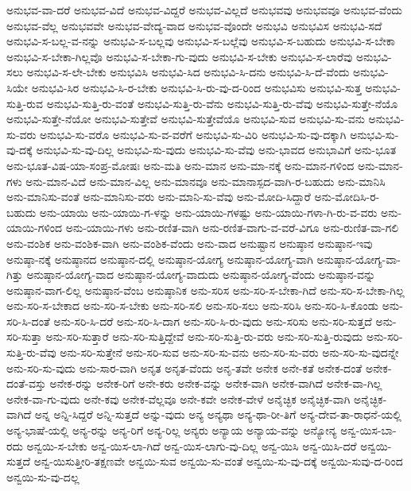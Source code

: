 {ಅನುಭವ-ವಾ-ದರೆ
ಅನುಭವ-ವಿದೆ
ಅನುಭವ-ವಿದ್ದರೆ
ಅನುಭವ-ವಿಲ್ಲದೆ
ಅನುಭವವು
ಅನುಭವವೂ
ಅನುಭವ-ವೆಂದು
ಅನುಭವ-ವೆಲ್ಲ
ಅನುಭವವೇ
ಅನುಭವ-ವೇದ್ಯ-ವಾದ
ಅನುಭವ-ವೊಂದೇ
ಅನುಭವಿ
ಅನುಭವಿಸ
ಅನುಭವಿ-ಸದೆ
ಅನುಭವಿ-ಸ-ಬಲ್ಲ-ವ-ನನ್ನು
ಅನುಭವಿ-ಸ-ಬಲ್ಲವು
ಅನುಭವಿ-ಸ-ಬಲ್ಲೆವು
ಅನುಭವಿ-ಸ-ಬಹುದು
ಅನುಭವಿ-ಸ-ಬೇಕಾ
ಅನುಭವಿ-ಸ-ಬೇಕಾ-ಗಿಲ್ಲವೊ
ಅನುಭವಿ-ಸ-ಬೇಕಾ-ಗು-ವುದು
ಅನುಭವಿ-ಸ-ಬೇಕು
ಅನುಭವಿ-ಸ-ಲಾರೆವು
ಅನುಭವಿ-ಸಲು
ಅನುಭವಿ-ಸ-ಲೇ-ಬೇಕು
ಅನುಭವಿಸಿ
ಅನುಭವಿ-ಸಿದ
ಅನುಭವಿ-ಸಿ-ದನು
ಅನುಭವಿ-ಸಿ-ದೆ-ವೆಂದು
ಅನುಭವಿ-ಸಿಯೇ
ಅನುಭವಿ-ಸಿರ
ಅನುಭವಿ-ಸಿ-ರ-ಬೇಕು
ಅನುಭವಿ-ಸಿ-ರು-ವು-ದ-ರಿಂದ
ಅನುಭವಿಸು
ಅನುಭವಿ-ಸುತ್ತ
ಅನುಭವಿ-ಸುತ್ತಿ-ರುವ
ಅನುಭವಿ-ಸುತ್ತಿ-ರು-ವಂತೆ
ಅನುಭವಿ-ಸುತ್ತಿ-ರು-ವೆನು
ಅನುಭವಿ-ಸುತ್ತಿ-ರು-ವೆವು
ಅನುಭವಿ-ಸುತ್ತೇ-ನೆಯೊ
ಅನುಭವಿ-ಸುತ್ತೇ-ನೆಯೋ
ಅನುಭವಿ-ಸುತ್ತೇವೆ
ಅನುಭವಿ-ಸುತ್ತೇವೆಯೊ
ಅನುಭವಿ-ಸುವ
ಅನುಭವಿ-ಸು-ವನು
ಅನುಭವಿ-ಸು-ವರು
ಅನುಭವಿ-ಸು-ವರೊ
ಅನುಭವಿ-ಸು-ವ-ವರೆಗೆ
ಅನುಭವಿ-ಸು-ವಿರಿ
ಅನುಭವಿ-ಸು-ವು-ದಕ್ಕಾಗಿ
ಅನುಭವಿ-ಸು-ವು-ದಕ್ಕೆ
ಅನುಭವಿ-ಸು-ವು-ದಿಲ್ಲ
ಅನುಭವಿ-ಸು-ವುದು
ಅನುಭವಿ-ಸು-ವೆವು
ಅನು-ಭಾವದ
ಅನುಭಾವಿಗೆ
ಅನು-ಭೂತ
ಅನು-ಭೂತ-ವಿಷ-ಯಾ-ಸಂಪ್ರ-ಮೋಷಃ
ಅನು-ಮತಿ
ಅನು-ಮಾನ
ಅನು-ಮಾ-ನಕ್ಕೆ
ಅನು-ಮಾನ-ಗಳಿಂದ
ಅನು-ಮಾನ-ಗಳು
ಅನು-ಮಾನ-ವಿದೆ
ಅನು-ಮಾನ-ವಿಲ್ಲ
ಅನು-ಮಾನವೂ
ಅನು-ಮಾನಾಸ್ಪದ-ವಾಗಿ-ರ-ಬಹುದು
ಅನು-ಮಾನಿಸಿ
ಅನು-ಮಾನಿಸು-ವಂತೆ
ಅನು-ಮಾನಿಸು-ವರು
ಅನು-ಮಾನಿ-ಸು-ವೆವು
ಅನು-ಮೋದಿ-ಸಿದ್ದಾರೆ
ಅನು-ಮೋದಿಸಿ-ರ-ಬಹುದು
ಅನು-ಯಾಯಿ
ಅನು-ಯಾಯಿ-ಗ-ಳನ್ನು
ಅನು-ಯಾಯಿ-ಗಳಷ್ಟು
ಅನು-ಯಾಯಿ-ಗಳಾ-ಗಿ-ರು-ವ-ವರು
ಅನು-ಯಾಯಿ-ಗಳಿಂದ
ಅನು-ಯಾಯಿ-ಗಳು
ಅನು-ರಣಿತ-ವಾಗಿ
ಅನು-ರಣಿತ-ವಾಗು-ವ-ವರೆ-ವಿಗೂ
ಅನು-ರುಣಿತ-ವಾ-ಗಲಿ
ಅನು-ವಂಶಿಕ
ಅನು-ವಂಶಿಕ-ವಾಗಿ
ಅನು-ವಂಶಿಕ-ವೆಂದು
ಅನು-ವಾದ
ಅನುಷ್ಟಾನ
ಅನುಷ್ಠಾನ
ಅನುಷ್ಠಾನ-ಇವು
ಅನುಷ್ಠಾ-ನಕ್ಕೆ
ಅನುಷ್ಠಾನದ
ಅನುಷ್ಠಾನ-ದಲ್ಲಿ
ಅನುಷ್ಠಾನ-ಯೋಗ್ಯ
ಅನುಷ್ಠಾನ-ಯೋಗ್ಯ-ವಾಗಿ
ಅನುಷ್ಠಾನ-ಯೋಗ್ಯ-ವಾ-ಗಿತ್ತು
ಅನುಷ್ಠಾನ-ಯೋಗ್ಯ-ವಾದ
ಅನುಷ್ಠಾನ-ಯೋಗ್ಯ-ವಾದುದು
ಅನುಷ್ಠಾನ-ಯೋಗ್ಯ-ವೆಂದು
ಅನುಷ್ಠಾನ-ವನ್ನು
ಅನುಷ್ಠಾನ-ವಾಗ-ಲಿಲ್ಲ
ಅನುಷ್ಠಾನ-ವೆಂಬ
ಅನುಷ್ಠಾನಿಕ
ಅನು-ಸರಿಸ
ಅನು-ಸರಿ-ಸ-ಬೇಕಾ-ಗಿದೆ
ಅನು-ಸರಿ-ಸ-ಬೇಕಾ-ಗಿಲ್ಲ
ಅನು-ಸರಿ-ಸ-ಬೇಕಾದ
ಅನು-ಸರಿ-ಸ-ಬೇಕು
ಅನು-ಸರಿ-ಸಲಿ
ಅನು-ಸರಿ-ಸಲು
ಅನು-ಸರಿಸಿ
ಅನು-ಸರಿ-ಸಿ-ಕೊಂಡು
ಅನು-ಸರಿ-ಸಿ-ದಂತೆ
ಅನು-ಸರಿ-ಸಿ-ದರೆ
ಅನು-ಸರಿ-ಸಿ-ದಾಗ
ಅನು-ಸರಿ-ಸಿ-ರು-ವುದು
ಅನು-ಸರಿಸು
ಅನು-ಸರಿ-ಸುತ್ತದೆ
ಅನು-ಸರಿ-ಸುತ್ತಾ
ಅನು-ಸರಿ-ಸುತ್ತಾರೆ
ಅನು-ಸರಿ-ಸುತ್ತಿದ್ದೇವೆ
ಅನು-ಸರಿ-ಸುತ್ತಿ-ರು-ವರು
ಅನು-ಸರಿ-ಸುತ್ತಿ-ರುವುದು
ಅನು-ಸರಿ-ಸುತ್ತಿ-ರು-ವೆವು
ಅನು-ಸರಿ-ಸುತ್ತೇನೆ
ಅನು-ಸರಿ-ಸುವ
ಅನು-ಸರಿ-ಸು-ವನು
ಅನು-ಸರಿ-ಸು-ವರು
ಅನು-ಸರಿ-ಸು-ವುದನ್ನೇ
ಅನು-ಸರಿ-ಸು-ವುದು
ಅನು-ಸಾರ-ವಾಗಿ
ಅನೃತ
ಅನೃತ-ವೆಂದು
ಅನೃ-ತವೇ
ಅನೇಕ
ಅನೇ-ಕತೆ
ಅನೇಕ-ದಂತೆ
ಅನೇಕ-ದಂತೆ-ವಸ್ತು
ಅನೇಕ-ರನ್ನು
ಅನೇಕ-ರಿಗೆ
ಅನೇ-ಕರು
ಅನೇಕ-ವನ್ನು
ಅನೇಕ-ವಾಗಿ
ಅನೇಕ-ವಾಗಿದೆ
ಅನೇಕ-ವಾ-ಗಿಲ್ಲ
ಅನೇಕ-ವಾ-ಗು-ವುದು
ಅನೇ-ಕವು
ಅನೇಕ-ವೆಲ್ಲವೂ
ಅನೇ-ಕವೇ
ಅನೇಕ-ವೇಳೆ
ಅನೈಚ್ಛಿಕ
ಅನೈಚ್ಛಿಕ-ವಾಗಿ
ಅನೈಚ್ಛಿಕ-ವಾಗಿದೆ
ಅನ್ನ
ಅನ್ನಿ-ಸಿದ್ದರೆ
ಅನ್ನಿ-ಸುತ್ತದೆ
ಅನ್ನು-ವುದು
ಅನ್ಯ
ಅನ್ಯಥಾ
ಅನ್ಯ-ಥಾ-ರೀ-ತಿಗೆ
ಅನ್ಯ-ದೇವ-ತಾ-ರಾಧನೆ-ಯಲ್ಲಿ
ಅನ್ಯ-ಭಾಷೆ-ಯಲ್ಲಿ
ಅನ್ಯ-ರನ್ನು
ಅನ್ಯ-ರಿಗೆ
ಅನ್ಯ-ರಿಲ್ಲ
ಅನ್ಯರು
ಅನ್ಯಾಯ
ಅನ್ಯಾಯ-ವನ್ನು
ಅನ್ಯೋನ್ಯ
ಅನ್ವ-ಯಿಸ-ಬಾ-ರದು
ಅನ್ವಯಿ-ಸ-ಬೇಕು
ಅನ್ವ-ಯಿಸ-ಲಾ-ಗಿದೆ
ಅನ್ವ-ಯಿಸ-ಲಾಗು-ವು-ದಿಲ್ಲ
ಅನ್ವ-ಯಿಸಿ
ಅನ್ವ-ಯಿಸಿ-ದರೆ
ಅನ್ವಯಿ-ಸುತ್ತದೆ
ಅನ್ವ-ಯಿಸುತ್ತೀರಿ-ತಕ್ಷಣವೇ
ಅನ್ವಯಿ-ಸುವ
ಅನ್ವಯಿ-ಸು-ವಂತೆ
ಅನ್ವಯಿ-ಸು-ವು-ದಕ್ಕೆ
ಅನ್ವಯಿ-ಸುವು-ದ-ರಿಂದ
ಅನ್ವಯಿ-ಸು-ವು-ದಲ್ಲ
}
